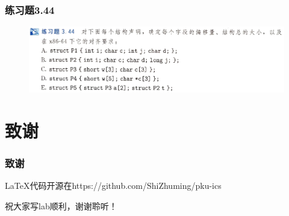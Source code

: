 \documentclass[12pt,AutoFakeBold,aspectratio=169,mathserif]{beamer}
\begin{document}
    \begin{frame}
        \frametitle{练习题3.44}
    
        \begin{figure}
            \includegraphics[width=.8\textwidth]{figures/344.png}
        \end{figure}
    
    \end{frame}

    \section*{致谢}

    \begin{frame}
        \frametitle{致谢}
        LaTeX代码开源在https://github.com/ShiZhuming/pku-ics

        祝大家写lab顺利，谢谢聆听！
    
    \end{frame}
    
\end{document}
